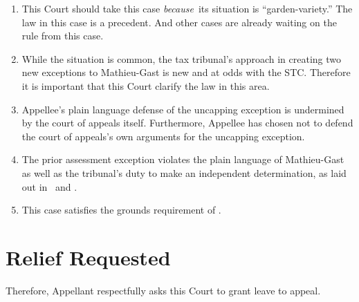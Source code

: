\documentclass[12pt,\documentclassflag]{michiganCourtOfAppealsBrief}
\begin{document}
\begin{enumerate}
\item This Court should take this case \emph{because}\ its situation is ``garden-variety.'' The law in this case is a precedent. And other cases are already waiting on the rule from this case.
  
\item While the situation is common, the tax tribunal's approach in creating two new exceptions to Mathieu-Gast is new and at odds with the STC. Therefore it is important that this Court clarify the law in this area.

\item Appellee's plain language defense of the uncapping exception is undermined by the court of appeals itself. Furthermore, Appellee has chosen not to defend the court of appeals's own arguments for the uncapping exception.

\item The prior assessment exception violates the plain language of Mathieu-Gast as well as the tribunal's duty to make an independent determination, as laid out in \cite{Jones & Laughlin}\ and \cite{Great Lakes Div of Nat'l Steel Corp}. 

\item This case satisfies the grounds requirement of \cite{MCR 7.305(B)}.
\end{enumerate}

\section{Relief Requested}

Therefore, Appellant respectfully asks this Court to grant leave to appeal.



\vspace{1\baselineskip}
\end{document}
